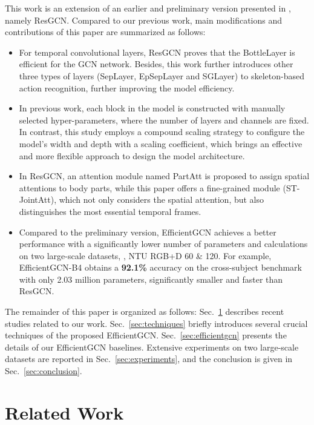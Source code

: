 \documentclass[10pt,journal,compsoc]{IEEEtran}
\begin{document}
This work is an extension of an earlier and preliminary version presented in \cite{song2020stronger}, namely ResGCN. Compared to our previous work, main modifications and contributions of this paper are summarized as follows:
\begin{itemize}
  \item For temporal convolutional layers, ResGCN proves that the BottleLayer is efficient for the GCN network. Besides, this work further introduces other three types of layers (SepLayer, EpSepLayer and SGLayer) to skeleton-based action recognition, further improving the model efficiency.
  \item In previous work, each block in the model is constructed with manually selected hyper-parameters, where the number of layers and channels are fixed. In contrast, this study employs a compound scaling strategy to configure the model's width and depth with a scaling coefficient, which brings an effective and more flexible approach to design the model architecture.
  \item In ResGCN, an attention module named PartAtt is proposed to assign spatial attentions to body parts, while this paper offers a fine-grained module (ST-JointAtt), which not only considers the spatial attention, but also distinguishes the most essential temporal frames.
  \item Compared to the preliminary version, EfficientGCN achieves a better performance with a significantly lower number of parameters and calculations on two large-scale datasets, \ie, NTU RGB+D 60 \& 120. For example, EfficientGCN-B4 obtains a {\bf 92.1\%} accuracy on the cross-subject benchmark with only 2.03 million parameters, significantly smaller and faster than ResGCN.
\end{itemize}

The remainder of this paper is organized as follows: Sec.~\ref{sec:related} describes recent studies related to our work. Sec.~\ref{sec:techniques} briefly introduces several crucial techniques of the proposed EfficientGCN. Sec.~\ref{sec:efficientgcn} presents the details of our EfficientGCN baselines. Extensive experiments on two large-scale datasets are reported in Sec.~\ref{sec:experiments}, and the conclusion is given in Sec.~\ref{sec:conclusion}.

\section{Related Work}
\label{sec:related}
\end{document}
